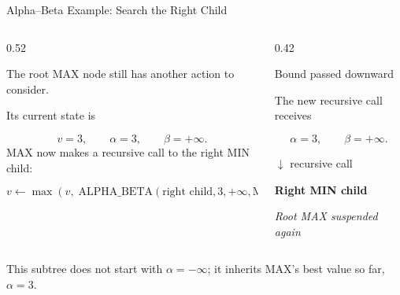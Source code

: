 \documentclass[aspectratio=169,10pt]{beamer}
\begin{document}



\begin{frame}[shrink=18]{Alpha--Beta Example: Search the Right Child}

  \begin{columns}[T,onlytextwidth]

    \begin{column}{0.52\textwidth}

      The root MAX node still has another action to consider.

      Its current state is

      \[
        v=3,\qquad
        \alpha=3,\qquad
        \beta=+\infty.
      \]
      MAX now makes a recursive call to the right MIN child:

      \[
        v \leftarrow
        \max\left(
          v,\;
          \text{ALPHA\_BETA}(\text{right child},3,+\infty,\text{MIN})
        \right).
      \]
    \end{column}

    \begin{column}{0.42\textwidth}

      \begin{block}{Bound passed downward}

        The new recursive call receives

        \[
          \alpha=3,\qquad \beta=+\infty.
        \]
      \end{block}

      \begin{center}

        $\downarrow$ recursive call

        \vspace{0.08in}

        \textbf{Right MIN child}

        \vspace{0.08in}

        \textit{Root MAX suspended again}

      \end{center}

    \end{column}

  \end{columns}

  \begin{keyidea}

    This subtree does not start with $\alpha=-\infty$; it inherits MAX's best value so far, $\alpha=3$.

  \end{keyidea}

\end{frame}
\end{document}

